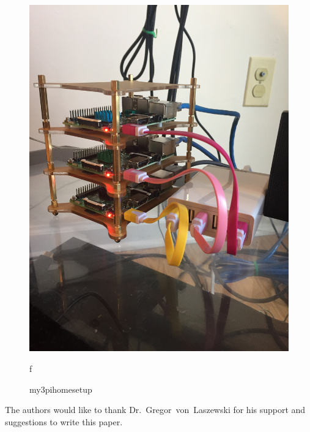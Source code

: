 \begin{figure}[!ht]
  \centering\includegraphics[width=\columnwidth]{images/hid-sp18-413-my3pi.png}
  \caption{my3pihomesetup}f
\end{figure}


\begin{acks}

  The authors would like to thank Dr.~Gregor~von~Laszewski for his
  support and suggestions to write this paper.

\end{acks}


 

